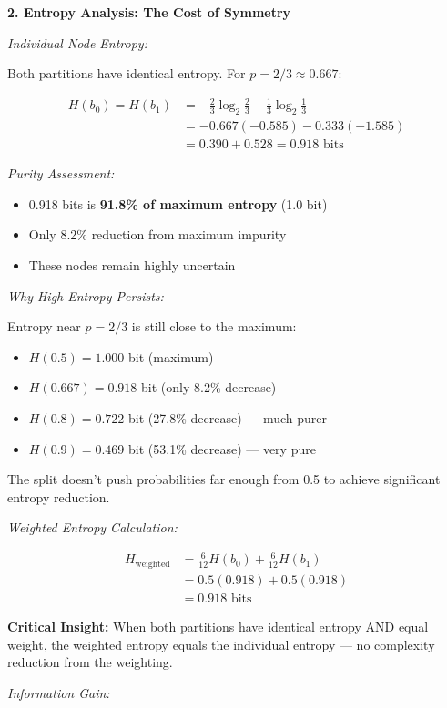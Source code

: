 \documentclass[12pt]{article}
\begin{document}
\begin{explanation}
\textbf{2. Entropy Analysis: The Cost of Symmetry}

\textit{Individual Node Entropy:}

Both partitions have identical entropy. For $p = 2/3 \approx 0.667$:

\begin{align*}
H(b_0) = H(b_1) &= -\frac{2}{3}\log_2\frac{2}{3} - \frac{1}{3}\log_2\frac{1}{3} \\
&= -0.667(-0.585) - 0.333(-1.585) \\
&= 0.390 + 0.528 = 0.918 \text{ bits}
\end{align*}

\textit{Purity Assessment:}
\begin{itemize}
    \item 0.918 bits is \textbf{91.8\% of maximum entropy} (1.0 bit)
    \item Only 8.2\% reduction from maximum impurity
    \item These nodes remain highly uncertain
\end{itemize}

\textit{Why High Entropy Persists:}

Entropy near $p = 2/3$ is still close to the maximum:
\begin{itemize}
    \item $H(0.5) = 1.000$ bit (maximum)
    \item $H(0.667) = 0.918$ bit (only 8.2\% decrease)
    \item $H(0.8) = 0.722$ bit (27.8\% decrease) — much purer
    \item $H(0.9) = 0.469$ bit (53.1\% decrease) — very pure
\end{itemize}

The split doesn't push probabilities far enough from 0.5 to achieve significant entropy reduction.

\textit{Weighted Entropy Calculation:}

\begin{align*}
H_{\text{weighted}} &= \frac{6}{12}H(b_0) + \frac{6}{12}H(b_1) \\
&= 0.5(0.918) + 0.5(0.918) \\
&= 0.918 \text{ bits}
\end{align*}

\textbf{Critical Insight:} When both partitions have identical entropy AND equal weight, the weighted entropy equals the individual entropy — no complexity reduction from the weighting.

\textit{Information Gain:}


\end{explanation}
\end{document}

